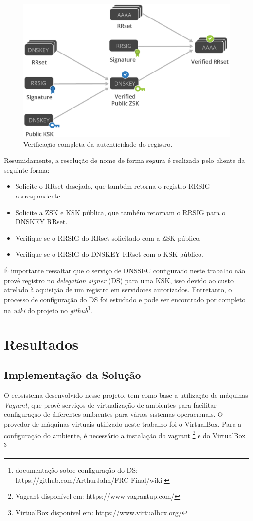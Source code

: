 \documentclass[12pt,openright,a4paper]{report}
\begin{document}
{\begin{figure}[h!]
	\centering
	\includegraphics[scale=0.4]{complete_req.eps}
	\caption{Verificação completa da autenticidade do registro.}
	\label{fig:keys}
\end{figure}

Resumidamente, a resolução de nome de forma segura é realizada pelo cliente da seguinte forma:
\begin{itemize}
	\item Solicite o RRset desejado, que também retorna o registro RRSIG correspondente.
	\item Solicite a ZSK e KSK pública, que também retornam o RRSIG para o DNSKEY RRset.
	\item Verifique se o RRSIG do RRset solicitado com a ZSK público.
	\item Verifique se o RRSIG do DNSKEY RRset com o KSK público.
\end{itemize}

É importante ressaltar que o serviço de DNSSEC configurado neste trabalho não provê registro no \textit{delegation signer} (DS) para uma KSK, isso devido ao custo atrelado à aquisição de um registro em servidores autorizados. Entretanto, o processo de configuração do DS foi estudado e pode ser encontrado por completo na \textit{wiki} do projeto no \textit{github}\footnote{documentação sobre configuração do DS: https://github.com/ArthurJahn/FRC-Final/wiki.}.

\chapter{Resultados}

\section{Implementação da Solução}
O ecosistema desenvolvido nesse projeto, tem como base a utilização de máquinas \textit{Vagrant}, que provê serviços de virtualização de ambientes para facilitar configuração de diferentes ambientes para vários sistemas operacionais. O provedor de máquinas virtuais utilizado neste trabalho foi o VirtualBox. Para a configuração do ambiente, é necessário a instalação do vagrant \footnote{Vagrant disponível em: https://www.vagrantup.com/} e do VirtualBox \footnote{VirtualBox disponível em: https://www.virtualbox.org/}.\\

}
\end{document}
